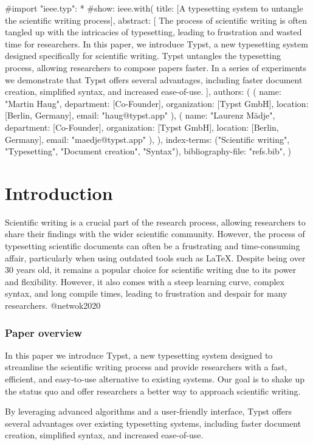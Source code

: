 
\iftypst
#import "ieee.typ": *
#show: ieee.with(
  title: [A typesetting system to untangle the scientific writing process],
  abstract: [
    The process of scientific writing is often tangled up with the intricacies of typesetting, leading to frustration and wasted time for researchers. In this paper, we introduce Typst, a new typesetting system designed specifically for scientific writing. Typst untangles the typesetting process, allowing researchers to compose papers faster. In a series of experiments we demonstrate that Typst offers several advantages, including faster document creation, simplified syntax, and increased ease-of-use.
  ],
  authors: (
    (
      name: "Martin Haug",
      department: [Co-Founder],
      organization: [Typst GmbH],
      location: [Berlin, Germany],
      email: "haug@typst.app"
    ),
    (
      name: "Laurenz Mädje",
      department: [Co-Founder],
      organization: [Typst GmbH],
      location: [Berlin, Germany],
      email: "maedje@typst.app"
    ),
  ),
  index-terms: ("Scientific writing", "Typesetting", "Document creation", "Syntax"),
  bibliography-file: "refs.bib",
)
\fi

\section{Introduction}
Scientific writing is a crucial part of the research process, allowing researchers to share their findings with the wider scientific community. However, the process of typesetting scientific documents can often be a frustrating and time-consuming affair, particularly when using outdated tools such as LaTeX. Despite being over 30 years old, it remains a popular choice for scientific writing due to its power and flexibility. However, it also comes with a steep learning curve, complex syntax, and long compile times, leading to frustration and despair for many researchers. @netwok2020

\subsubsection{Paper overview}
In this paper we introduce Typst, a new typesetting system designed to streamline the scientific writing process and provide researchers with a fast, efficient, and easy-to-use alternative to existing systems. Our goal is to shake up the status quo and offer researchers a better way to approach scientific writing.

By leveraging advanced algorithms and a user-friendly interface, Typst offers several advantages over existing typesetting systems, including faster document creation, simplified syntax, and increased ease-of-use.

